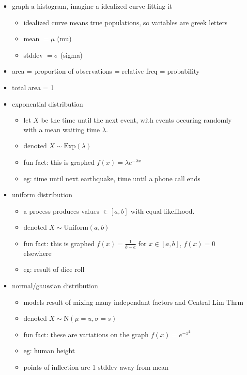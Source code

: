 \documentclass[11pt]{article}
\begin{document}
\begin{itemize}
  \begin{itemize}
    \item graph a histogram, imagine a idealized curve fitting it
    \begin{itemize}
      \item idealized curve means true populations, so variables are greek letters
      \item mean $= \mu$ (mu)
      \item stddev $= \sigma$ (sigma)
    \end{itemize}
    \item area = proportion of observations = relative freq = probability
    \item total area = 1
    \item exponential distribution
    \begin{itemize}
      \item let $X$ be the time until the next event, with events occuring randomly with a mean waiting time $\lambda$.
      \item denoted $X \sim \text{Exp}(\lambda)$
      \item fun fact: this is graphed $f(x) = \lambda e^{-\lambda x}$
      \item eg: time until next earthquake, time until a phone call ends
    \end{itemize}
    \item uniform distribution
    \begin{itemize}
      \item a process produces values $\in [a,b]$ with equal likelihood.
      \item denoted $X \sim \text{Uniform}(a,b)$
      \item fun fact: this is graphed $f(x) = \frac{1}{b-a}$ for $x\in [a,b]$, $f(x) = 0$ elsewhere
      \item eg: result of dice roll
    \end{itemize}
    \item normal/gaussian distribution
    \begin{itemize}
      \item models result of mixing many independant factors and Central Lim Thrm
      \item denoted $X \sim \text{N}(\mu = u, \sigma = s)$
      \item fun fact: these are variations on the graph $f(x) = e^{-x^2}$
      \item eg: human height
      \item points of inflection are 1 stddev away from mean

\end{itemize}
\end{itemize}
\end{itemize}
\end{document}
